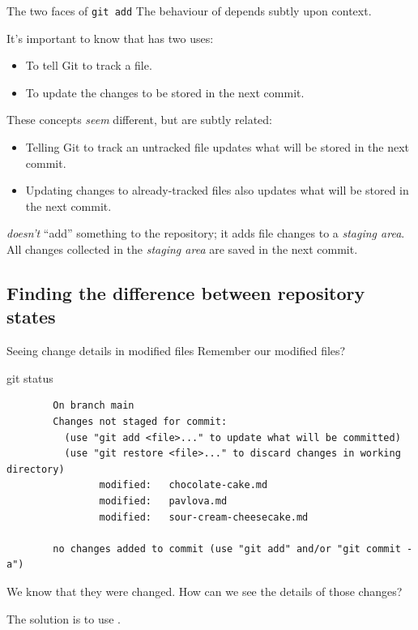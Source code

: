 \begin{frame}[fragile]{The two faces of \texttt{git add}}
    The behaviour of  depends subtly upon context.

    It's important to know that  has two uses:
    \begin{itemize}
        \item To tell Git to track a file.
        \item To update the changes to be stored in the next commit.
    \end{itemize}

    These concepts \emph{seem} different, but are subtly related:
    \begin{itemize}
        \item Telling Git to track an untracked file updates what will be
            stored in the next commit.
        \item Updating changes to already-tracked files also updates what
            will be stored in the next commit.
    \end{itemize}

     \emph{doesn't} ``add'' something to the repository; it
    adds file changes to a \emph{staging area}.  All changes collected in
    the \emph{staging area} are saved in the next commit.
\end{frame}

\subsection{Finding the difference between repository states}

\begin{frame}[fragile]{Seeing change details in modified files}
    Remember our modified files?
    \begin{shellcode}
        git status
    \end{shellcode}
    \begin{verbatim}
        On branch main
        Changes not staged for commit:
          (use "git add <file>..." to update what will be committed)
          (use "git restore <file>..." to discard changes in working directory)
                modified:   chocolate-cake.md
                modified:   pavlova.md
                modified:   sour-cream-cheesecake.md

        no changes added to commit (use "git add" and/or "git commit -a")
    \end{verbatim}

    We know that they were changed.  How can we see the details of those
    changes?

    The solution is to use .
\end{frame}

